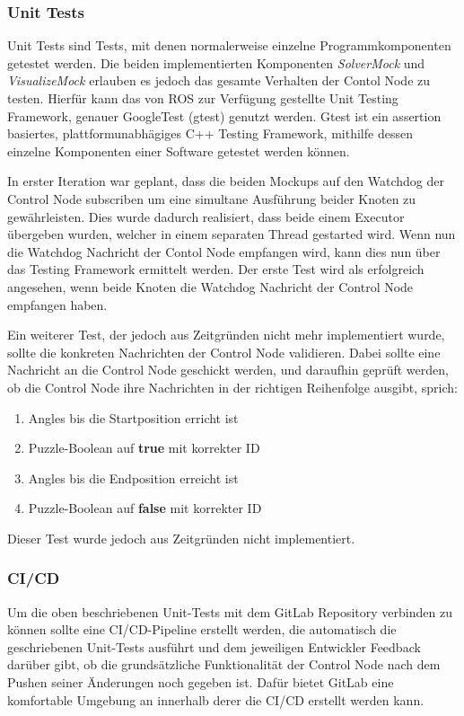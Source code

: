 \subsubsection{Unit Tests}
Unit Tests sind Tests, mit denen normalerweise einzelne Programmkomponenten getestet werden. Die beiden implementierten Komponenten \textit{SolverMock} und \textit{VisualizeMock} erlauben es jedoch das gesamte Verhalten der Contol Node zu testen. Hierfür kann das von ROS zur Verfügung gestellte Unit Testing Framework, genauer GoogleTest (gtest) genutzt werden. Gtest ist ein assertion basiertes, plattformunabhägiges C++ Testing Framework, mithilfe dessen einzelne Komponenten einer Software getestet werden können. 

In erster Iteration war geplant, dass die beiden Mockups auf den Watchdog der Control Node subscriben um eine simultane Ausführung beider Knoten zu gewährleisten. Dies wurde dadurch realisiert, dass beide einem Executor übergeben wurden, welcher in einem separaten Thread gestarted wird. Wenn nun die Watchdog Nachricht der Contol Node empfangen wird, kann dies nun über das Testing Framework ermittelt werden. 
Der erste Test wird als erfolgreich angesehen, wenn beide Knoten die Watchdog Nachricht der Control Node empfangen haben. 

Ein weiterer Test, der jedoch aus Zeitgründen nicht mehr implementiert wurde, sollte die konkreten Nachrichten der Control Node validieren. Dabei sollte eine Nachricht an die Control Node geschickt werden, und daraufhin geprüft werden, ob die Control Node ihre Nachrichten in der richtigen Reihenfolge ausgibt, sprich: 
\begin{enumerate}
    \item Angles bis die Startposition erricht ist
    \item Puzzle-Boolean auf \textbf{true} mit korrekter ID 
    \item Angles bis die Endposition erreicht ist
    \item Puzzle-Boolean auf \textbf{false} mit korrekter ID
\end{enumerate}

Dieser Test wurde jedoch aus Zeitgründen nicht implementiert. 

\subsubsection{CI/CD}
Um die oben beschriebenen Unit-Tests mit dem GitLab Repository verbinden zu können sollte eine CI/CD-Pipeline erstellt werden, die automatisch die geschriebenen Unit-Tests ausführt und dem jeweiligen Entwickler Feedback darüber gibt, ob die grundsätzliche Funktionalität der Control Node nach dem Pushen seiner Änderungen noch gegeben ist. Dafür bietet GitLab eine komfortable Umgebung an innerhalb derer die CI/CD erstellt werden kann. 

